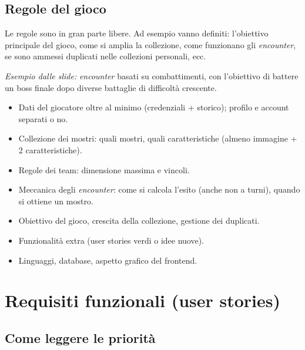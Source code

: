 \documentclass[11pt,a4paper]{article}
\newcommand{\enc}{\emph{encounter}}
\begin{document}
\subsection{Regole del gioco}
Le regole sono in gran parte libere. Ad esempio vanno definiti:
l'obiettivo principale del gioco, come si amplia la collezione, come funzionano gli \enc,
se sono ammessi duplicati nelle collezioni personali, ecc.

\emph{Esempio dalle slide:} \enc{} basati su combattimenti, con l'obiettivo di battere un boss finale
dopo diverse battaglie di difficoltà crescente.

\begin{choicebox}[title={Decisioni lasciate al gruppo}]
\begin{itemize}[leftmargin=1.2em]
  \item Dati del giocatore oltre al minimo (credenziali + storico); profilo e account separati o no.
  \item Collezione dei mostri: quali mostri, quali caratteristiche (almeno immagine + 2 caratteristiche).
  \item Regole dei team: dimensione massima e vincoli.
  \item Meccanica degli \enc: come si calcola l'esito (anche non a turni), quando si ottiene un mostro.
  \item Obiettivo del gioco, crescita della collezione, gestione dei duplicati.
  \item Funzionalità extra (user stories verdi o idee nuove).
  \item Linguaggi, database, aspetto grafico del frontend.
\end{itemize}
\end{choicebox}

\section{Requisiti funzionali (user stories)}\label{sec:us}

\subsection{Come leggere le priorità}
\end{document}
